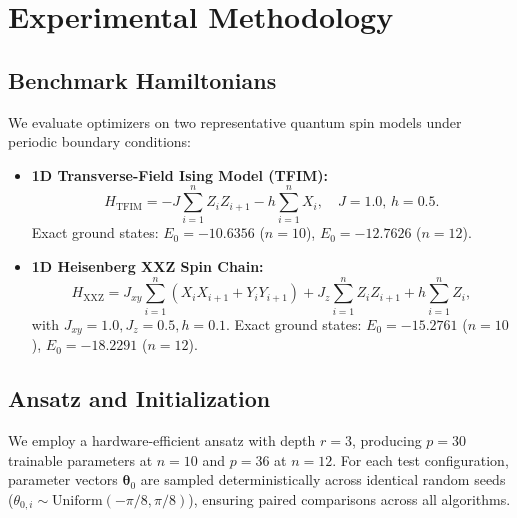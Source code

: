 \documentclass[11pt,a4paper]{article}
\begin{document}
\section{Experimental Methodology}
\label{sec:setup}

\subsection{Benchmark Hamiltonians}
We evaluate optimizers on two representative quantum spin models under periodic boundary conditions:
\begin{itemize}
    \item \textbf{1D Transverse-Field Ising Model (TFIM):}
    \begin{equation}
    H_{\text{TFIM}} = -J \sum_{i=1}^n Z_i Z_{i+1} - h \sum_{i=1}^n X_i, \quad J = 1.0, \, h = 0.5.
    \end{equation}
    Exact ground states: $E_0 = -10.6356$ ($n=10$), $E_0 = -12.7626$ ($n=12$).
    \item \textbf{1D Heisenberg XXZ Spin Chain:}
    \begin{equation}
    H_{\text{XXZ}} = J_{xy} \sum_{i=1}^n (X_i X_{i+1} + Y_i Y_{i+1}) + J_z \sum_{i=1}^n Z_i Z_{i+1} + h \sum_{i=1}^n Z_i,
    \end{equation}
    with $J_{xy} = 1.0, J_z = 0.5, h = 0.1$. Exact ground states: $E_0 = -15.2761$ ($n=10$), $E_0 = -18.2291$ ($n=12$).
\end{itemize}

\subsection{Ansatz and Initialization}
We employ a hardware-efficient ansatz with depth $r=3$, producing $p=30$ trainable parameters at $n=10$ and $p=36$ at $n=12$. For each test configuration, parameter vectors $\boldsymbol{\theta}_0$ are sampled deterministically across identical random seeds ($\theta_{0,i} \sim \text{Uniform}(-\pi/8, \pi/8)$), ensuring paired comparisons across all algorithms.
\end{document}
